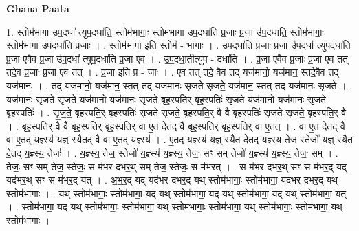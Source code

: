 \documentclass[17pt]{extarticle}
\begin{document}
\textbf{Ghana Paata } \newline

1. स्तोम॑भागा उप॒दधा᳚ त्युप॒दधा॑ति॒ स्तोम॑भागाः॒ स्तोम॑भागा उप॒दधा॑ति प्र॒जाः प्र॒जा उ॑प॒दधा॑ति॒ स्तोम॑भागाः॒ स्तोम॑भागा उप॒दधा॑ति प्र॒जाः । . स्तोम॑भागा॒ इति॒ स्तोम॑ - भा॒गाः॒ । . उ॒प॒दधा॑ति प्र॒जाः प्र॒जा उ॑प॒दधा᳚ त्युप॒दधा॑ति प्र॒जा ए॒वैव प्र॒जा उ॑प॒दधा᳚ त्युप॒दधा॑ति प्र॒जा ए॒व । . उ॒प॒दधा॒तीत्यु॑प - दधा॑ति । . प्र॒जा ए॒वैव प्र॒जाः प्र॒जा ए॒व तत् तदे॒व प्र॒जाः प्र॒जा ए॒व तत् । . प्र॒जा इति॑ प्र - जाः । . ए॒व तत् तदे॒ वैव तद् यज॑मानो॒ यज॑मान॒ स्तदे॒वैव तद् यज॑मानः । . तद् यज॑मानो॒ यज॑मान॒ स्तत् तद् यज॑मानः सृजते सृजते॒ यज॑मान॒ स्तत् तद् यज॑मानः सृजते । . यज॑मानः सृजते सृजते॒ यज॑मानो॒ यज॑मानः सृजते॒ बृह॒स्पति॒र् बृह॒स्पतिः॑ सृजते॒ यज॑मानो॒ यज॑मानः सृजते॒ बृह॒स्पतिः॑ । . सृ॒ज॒ते॒ बृह॒स्पति॒र् बृह॒स्पतिः॑ सृजते सृजते॒ बृह॒स्पति॒र् वै वै बृह॒स्पतिः॑ सृजते सृजते॒ बृह॒स्पति॒र् वै । . बृह॒स्पति॒र् वै वै बृह॒स्पति॒र् बृह॒स्पति॒र् वा ए॒त दे॒तद् वै बृह॒स्पति॒र् बृह॒स्पति॒र् वा ए॒तत् । . वा ए॒त दे॒तद् वै वा ए॒तद् य॒ज्ञ्स्य॑ य॒ज्ञ् स्यै॒तद् वै वा ए॒तद् य॒ज्ञ्स्य॑ । . ए॒तद् य॒ज्ञ्स्य॑ य॒ज्ञ् स्यै॒त दे॒तद् य॒ज्ञ्स्य॒ तेज॒ स्तेजो॑ य॒ज्ञ् स्यै॒त दे॒तद् य॒ज्ञ्स्य॒ तेजः॑ । . य॒ज्ञ्स्य॒ तेज॒ स्तेजो॑ य॒ज्ञ्स्य॑ य॒ज्ञ्स्य॒ तेजः॒ सꣳ सम् तेजो॑ य॒ज्ञ्स्य॑ य॒ज्ञ्स्य॒ तेजः॒ सम् । . तेजः॒ सꣳ सम् तेज॒ स्तेजः॒ स म॑भर दभर॒थ् सम् तेज॒ स्तेजः॒ स म॑भरत् । . स म॑भर दभर॒थ् सꣳ स म॑भर॒द् यद् यद॑भर॒थ् सꣳ स म॑भर॒द् यत् । . अ॒भ॒र॒द् यद् यद॑भर दभर॒द् यथ् स्तोम॑भागाः॒ स्तोम॑भागा॒ यद॑भर दभर॒द् यथ् स्तोम॑भागाः । . यथ् स्तोम॑भागाः॒ स्तोम॑भागा॒ यद् यथ् स्तोम॑भागा॒ यद् यथ् स्तोम॑भागा॒ यद् यथ् स्तोम॑भागा॒ यत् । . स्तोम॑भागा॒ यद् यथ् स्तोम॑भागाः॒ स्तोम॑भागा॒ यथ् स्तोम॑भागाः॒ स्तोम॑भागा॒ यथ् स्तोम॑भागाः॒ स्तोम॑भागा॒ यथ् स्तोम॑भागाः । \newline
\end{document}
